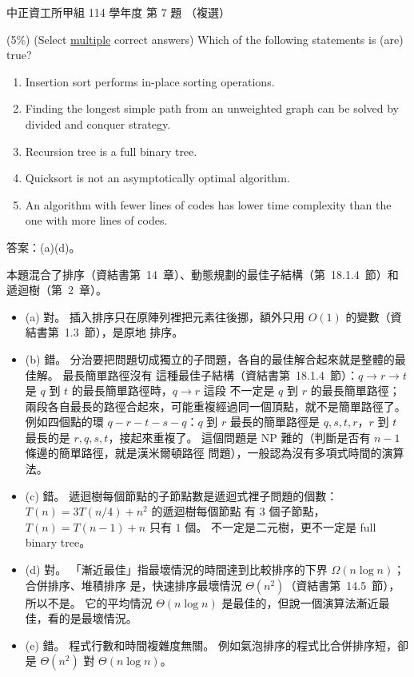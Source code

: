 \begin{pastexam}[label={px:ccu-114-swa-07}]{中正資工所甲組 114 學年度 第 7 題}
（複選）

(5\%) (Select \underline{multiple} correct answers) Which of the following statements is (are) true?
\begin{enumerate}[label=(\alph*)]
\item Insertion sort performs in-place sorting operations.
\item Finding the longest simple path from an unweighted graph can be solved by divided and conquer
strategy.
\item Recursion tree is a full binary tree.
\item Quicksort is not an asymptotically optimal algorithm.
\item An algorithm with fewer lines of codes has lower time complexity than the one with more lines of
codes.
\end{enumerate}
\end{pastexam}

\begin{pastsoln}
答案：(a)(d)。

本題混合了排序（資結書第~14~章）、動態規劃的最佳子結構（第~18.1.4~節）和遞迴樹（第~2~章）。

\begin{itemize}
\item (a) 對。 插入排序只在原陣列裡把元素往後挪，額外只用 $O(1)$ 的變數（資結書第~1.3~節），是原地
排序。
\item (b) 錯。 分治要把問題切成獨立的子問題，各自的最佳解合起來就是整體的最佳解。 最長簡單路徑沒有
這種最佳子結構（資結書第~18.1.4~節）：$q \to r \to t$ 是 $q$ 到 $t$ 的最長簡單路徑時，$q \to r$ 這段
不一定是 $q$ 到 $r$ 的最長簡單路徑；兩段各自最長的路徑合起來，可能重複經過同一個頂點，就不是簡單路徑了。
例如四個點的環 $q - r - t - s - q$：$q$ 到 $r$ 最長的簡單路徑是 $q, s, t, r$，$r$ 到 $t$ 最長的是
$r, q, s, t$，接起來重複了。 這個問題是 NP 難的（判斷是否有 $n - 1$ 條邊的簡單路徑，就是漢米爾頓路徑
問題），一般認為沒有多項式時間的演算法。
\item (c) 錯。 遞迴樹每個節點的子節點數是遞迴式裡子問題的個數：$T(n) = 3T(n/4) + n^2$ 的遞迴樹每個節點
有 $3$ 個子節點，$T(n) = T(n-1) + n$ 只有 $1$ 個。 不一定是二元樹，更不一定是 full binary tree。
\item (d) 對。 「漸近最佳」指最壞情況的時間達到比較排序的下界 $\Omega(n \log n)$；合併排序、堆積排序
是，快速排序最壞情況 $\Theta(n^2)$（資結書第~14.5~節），所以不是。 它的平均情況 $\Theta(n \log n)$
是最佳的，但說一個演算法漸近最佳，看的是最壞情況。
\item (e) 錯。 程式行數和時間複雜度無關。 例如氣泡排序的程式比合併排序短，卻是 $\Theta(n^2)$ 對
$\Theta(n \log n)$。
\end{itemize}
\end{pastsoln}

